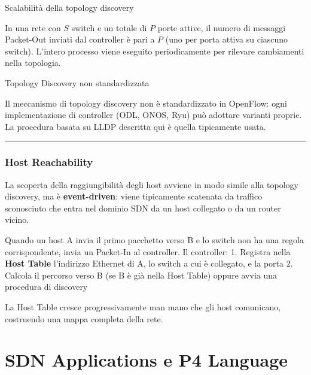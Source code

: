 \documentclass[
  italian,
  openany]{book}
\begin{document}
\begin{callouttip}{Scalabilità della topology discovery}

In una rete con \(S\) switch e un totale di \(P\) porte attive, il
numero di messaggi Packet-Out inviati dal controller è pari a \(P\) (uno
per porta attiva su ciascuno switch). L'intero processo viene eseguito
periodicamente per rilevare cambiamenti nella topologia.

\end{callouttip}

\begin{calloutnote}{Topology Discovery non standardizzata}

Il meccanismo di topology discovery non è standardizzato in OpenFlow:
ogni implementazione di controller (ODL, ONOS, Ryu) può adottare
varianti proprie. La procedura basata su LLDP descritta qui è quella
tipicamente usata.

\end{calloutnote}

\begin{center}\rule{0.5\linewidth}{0.5pt}\end{center}

\subsection{Host Reachability}\label{host-reachability}

La scoperta della raggiungibilità degli host avviene in modo simile alla
topology discovery, ma è \textbf{event-driven}: viene tipicamente
scatenata da traffico sconosciuto che entra nel dominio SDN da un host
collegato o da un router vicino.

Quando un host A invia il primo pacchetto verso B e lo switch non ha una
regola corrispondente, invia un Packet-In al controller. Il controller:
1. Registra nella \textbf{Host Table} l'indirizzo Ethernet di A, lo
switch a cui è collegato, e la porta 2. Calcola il percorso verso B (se
B è già nella Host Table) oppure avvia una procedura di discovery

La Host Table cresce progressivamente man mano che gli host comunicano,
costruendo una mappa completa della rete.

\newpage

\chapter{SDN Applications e P4
Language}\label{sdn-applications-e-p4-language}
\end{document}
